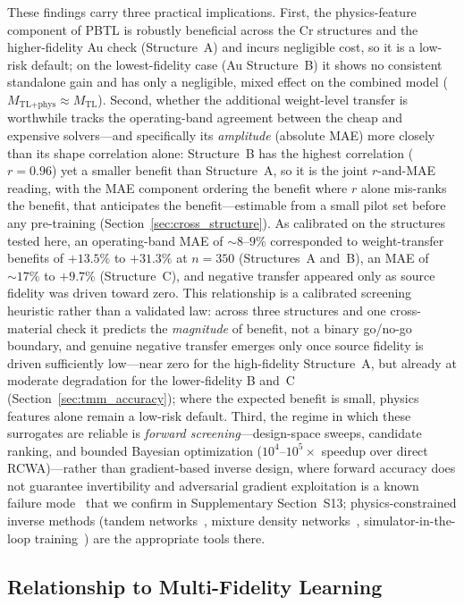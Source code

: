 \documentclass[a4paper,fleqn]{cas-sc}
\newcommand{\Mtl}{M_\text{TL}}
\newcommand{\Mtlphys}{M_\text{TL+phys}}
\begin{document}
These findings carry three practical implications. First, the physics-feature component of PBTL is robustly beneficial across the Cr structures and the higher-fidelity Au check (Structure~A) and incurs negligible cost, so it is a low-risk default; on the lowest-fidelity case (Au Structure~B) it shows no consistent standalone gain and has only a negligible, mixed effect on the combined model ($\Mtlphys \approx \Mtl$). Second, whether the additional weight-level transfer is worthwhile tracks the operating-band agreement between the cheap and expensive solvers---and specifically its \emph{amplitude} (absolute MAE) more closely than its shape correlation alone: Structure~B has the highest correlation ($r=0.96$) yet a smaller benefit than Structure~A, so it is the joint $r$-and-MAE reading, with the MAE component ordering the benefit where $r$ alone mis-ranks the benefit, that anticipates the benefit---estimable from a small pilot set before any pre-training (Section~\ref{sec:cross_structure}). As calibrated on the structures tested here, an operating-band MAE of ${\sim}8$--$9\%$ corresponded to weight-transfer benefits of $+13.5\%$ to $+31.3\%$ at $n=350$ (Structures~A and~B), an MAE of ${\sim}17\%$ to $+9.7\%$ (Structure~C), and negative transfer appeared only as source fidelity was driven toward zero. This relationship is a calibrated screening heuristic rather than a validated law: across three structures and one cross-material check it predicts the \emph{magnitude} of benefit, not a binary go/no-go boundary, and genuine negative transfer emerges only once source fidelity is driven sufficiently low---near zero for the high-fidelity Structure~A, but already at moderate degradation for the lower-fidelity B and~C (Section~\ref{sec:tmm_accuracy}); where the expected benefit is small, physics features alone remain a low-risk default. Third, the regime in which these surrogates are reliable is \emph{forward screening}---design-space sweeps, candidate ranking, and bounded Bayesian optimization ($10^4$--$10^5\times$ speedup over direct RCWA)---rather than gradient-based inverse design, where forward accuracy does not guarantee invertibility and adversarial gradient exploitation is a known failure mode~\cite{liu2018training,peurifoy2018nanophotonic} that we confirm in Supplementary Section~S13; physics-constrained inverse methods (tandem networks~\cite{liu2018training}, mixture density networks~\cite{unni2020deep}, simulator-in-the-loop training~\cite{jiang2020simulator}) are the appropriate tools there.

\subsection{Relationship to Multi-Fidelity Learning}
\end{document}
